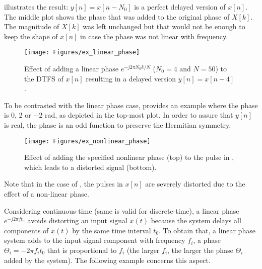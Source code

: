  illustrates the result: $y[n]=x[n-N_0]$ is a perfect delayed version of $x[n]$. The middle plot shows the phase that was added to the original phase of $X[k]$. The magnitude of $X[k]$ was left unchanged but that would not be enough to keep the shape of $x[n]$ in case the phase was not linear with frequency. 

\begin{figure}
\centering
\texttt{[image: Figures/ex\_linear\_phase]}
\caption{Effect of adding a linear phase $e^{-j 2\pi N_0 k/ N}$ ($N_0=4$ and $N=50$) to the DTFS of $x[n]$ resulting in a delayed version $y[n]=x[n-4]$ .\label{fig:ex_linear_phase}}
\end{figure}

To be contrasted with the linear phase case,  provides an example where the phase is 0, 2 or $-2$ rad, as depicted in the top-most plot. In order to assure that $y[n]$ is real, the phase is an odd function to preserve the Hermitian symmetry. 

\begin{figure}
\centering
\texttt{[image: Figures/ex\_nonlinear\_phase]}
\caption{Effect of adding the specified nonlinear phase (top) to the pulse in , which leads to a distorted signal (bottom).\label{fig:ex_nonlinear_phase}}
\end{figure}

Note that in the case of , the pulses in $x[n]$ are severely distorted due to the effect of a non-linear phase.
\eExample 

Considering continuous-time (same is valid for discrete-time), a linear phase $e^{-j 2 \pi f t_0}$ avoids distorting an input signal $x(t)$ because the system delays all components of $x(t)$ by the same time interval $t_0$. To obtain that, a linear phase system adds to the input signal component with 
frequency $f_i$, a phase $\Theta_i = - 2 \pi f_i t_0$ that is proportional to $f_i$ (the larger
$f_i$, the larger the phase $\Theta_i$ added by the system). The following example concerns this aspect.

